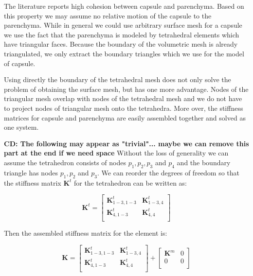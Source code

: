 \documentclass{llncs}
\newcommand{\CD}[1]{{\color{green}\textbf{CD: #1}}}
\newcommand{\Mat}[1]{\mathbf{#1}}
\begin{document}
The literature reports high cohesion between capsule and parenchyma.
Based on this
property we may assume no relative motion of the capsule to the parenchyma.
While in general we could use arbitrary surface mesh for a capsule we use
the fact that the parenchyma is modeled by tetrahedral elements which have
triangular faces. Because the boundary of the volumetric mesh is already
triangulated, we only extract the boundary triangles which we use for the
model of capsule.

Using directly the boundary of the tetrahedral mesh does not only solve the
problem of obtaining the surface mesh, but has one more advantage. Nodes
of the triangular mesh overlap with nodes of the tetrahedral mesh and we do
not have to project nodes of triangular mesh onto the tetrahedra. More over,
the stiffness matrices for capsule and parenchyma are easily assembled
together and solved as one system.

\CD{The following may appear as "trivial"... maybe we can remove this part at the end if we need space} 
Without the loss of generality we can assume the tetrahedron consists of
nodes $p_1, p_2, p_3$ and $p_4$ and the boundary triangle has nodes $p_1, p_2$
and $p_3$. We can reorder the degrees of freedom so that the stiffness
matrix $\Mat{K}^t$ for the tetrahedron can be written as:

\begin{equation}
  \Mat{K}^t = \left[\begin{array}{c|c}
      \Mat{K}^t_{1-3,1-3} & \Mat{K}^t_{1-3,4} \\
      \hline
      \Mat{K}^t_{4,1-3} & \Mat{K}^t_{4,4} \\
  \end{array}\right]
\end{equation}

Then the assembled stiffness matrix for the element is:

\begin{equation}
  \Mat{K} = \left[\begin{array}{c|c}
      \Mat{K}^t_{1-3,1-3} & \Mat{K}^t_{1-3,4} \\
      \hline
      \Mat{K}^t_{4,1-3} & \Mat{K}^t_{4,4} \\
  \end{array}\right]
  +
  \left[\begin{array}{c|c}
      \Mat{K}^m & 0 \\
      \hline
      0 & 0 \\
  \end{array}\right]
\end{equation}
\end{document}
